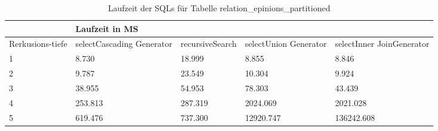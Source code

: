 \begin{table}[H]
	\centering
	\begin{tabular}{l|l|l|l|l|l|}
		\cline{2-6}
		& \multicolumn{5}{|l|}{Laufzeit in MS}                                                                                                                                                  \\ \hline
		\multicolumn{1}{|l|}{\multirow{2}{2cm}{Rerkusions-tiefe}} & \multicolumn{2}{|l|}{\multirow{2}{3cm}{selectCascading Generator}} & \multirow{2}{2.8cm}{recursiveSearch} & \multirow{2}{2.5cm}{selectUnion Generator} & \multirow{2}{2.5cm}{selectInner JoinGenerator} \\
		\multicolumn{1}{|l|}{}
		& \multicolumn{2}{|l|}{}                                           &                                  &                                     &                                           \\ \hline
		
	\multicolumn{1}{|l|}{1}                                 & \multicolumn{2}{l|}{8.730}                                       & 18.999                                                & 8.855                                                     & 8.846                                                           \\ \hline
	\multicolumn{1}{|l|}{2}                                 & \multicolumn{2}{l|}{9.787}                                       & 23.549                                                & 10.304                                                    & 9.924                                                           \\ \hline
	\multicolumn{1}{|l|}{3}                                 & \multicolumn{2}{l|}{38.955}                                      & 54.953                                                & 78.303                                                    & 43.439                                                          \\ \hline
	\multicolumn{1}{|l|}{4}                                 & \multicolumn{2}{l|}{253.813}                                     & 287.319                                               & 2024.069                                                  & 2021.028                                                        \\ \hline
	\multicolumn{1}{|l|}{5}                                 & \multicolumn{2}{l|}{619.476}                                     & 737.300                                               & 12920.747                                                 & 136242.608                                                      \\ \hline
	
		
		
	\end{tabular}
	\caption{Laufzeit der SQLs für Tabelle relation\_epinions\_partitioned}
	\label{2.relationepinionspartion.table}
\end{table}

